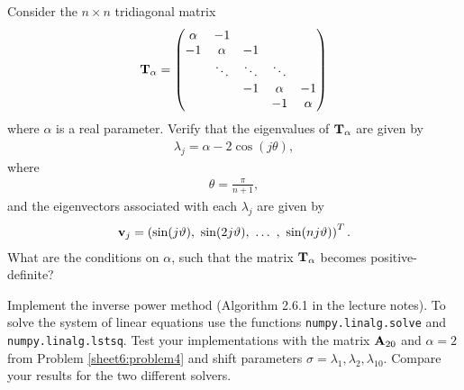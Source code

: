 \begin{Sheet}
	\begin{Problem}
		\label{sheet6:problem4}
		Consider the $n\times n$ tridiagonal matrix
		\begin{gather*}
		\mathbf T_{\alpha} =
		\begin{pmatrix}
		\alpha &     -1 &        &        & \\
		-1 & \alpha &     -1 &        & \\
		& \ddots & \ddots & \ddots & \\
		&        &     -1 & \alpha &     -1 \\
		&        &        &     -1 & \alpha
		\end{pmatrix}
		\end{gather*}
		where $\alpha$ is a real parameter. Verify that the eigenvalues of
		$\mathbf T_{\alpha}$ are given by
		\begin{gather*}
		\lambda_j = \alpha - 2\cos(j\theta),
		\end{gather*}
		where
		\begin{gather*}
		\theta = \frac\pi{n+1},
		\end{gather*}
		and the eigenvectors associated with each $\lambda_j$ are given by
		\begin{gather*}
		\mathbf v_j = \left(
		\sin(j\vartheta),\ \sin(2j\vartheta),\ \ldots\ ,\ \sin(nj\vartheta)
		\right)^T.
		\end{gather*}
		What are the conditions on $\alpha$, such that the matrix
		$\mathbf T_{\alpha}$ becomes positive-definite?
	\end{Problem}

	\begin{Problem}
		\label{sheet6:problem5}
		Implement the inverse power method (Algorithm 2.6.1 in the lecture notes).
        To solve the system of linear equations use the functions \texttt{numpy.linalg.solve} and \texttt{numpy.linalg.lstsq}.
        Test your implementations with the matrix $\mathbf A_{20}$ and $\alpha=2$ from Problem \ref{sheet6:problem4} and shift parameters $\sigma=\lambda_1,\lambda_2,\lambda_{10}$.
        Compare your results for the two different solvers.
	\end{Problem}

\end{Sheet}


